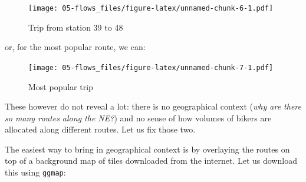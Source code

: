 \documentclass[
]{book}
\newenvironment{Shaded}{\begin{snugshade}}{\end{snugshade}}
\newcommand{\DecValTok}[1]{\textcolor[rgb]{0.00,0.00,0.81}{#1}}
\newcommand{\KeywordTok}[1]{\textcolor[rgb]{0.13,0.29,0.53}{\textbf{#1}}}
\newcommand{\NormalTok}[1]{#1}
\newcommand{\OperatorTok}[1]{\textcolor[rgb]{0.81,0.36,0.00}{\textbf{#1}}}
\newcommand{\StringTok}[1]{\textcolor[rgb]{0.31,0.60,0.02}{#1}}
\begin{document}
\begin{Shaded}
\end{Shaded}

\begin{figure}
\centering
\texttt{[image: 05-flows\_files/figure-latex/unnamed-chunk-6-1.pdf]}
\caption{\label{fig:unnamed-chunk-6}Trip from station 39 to 48}
\end{figure}

or, for the most popular route, we can:

\begin{Shaded}
\end{Shaded}

\begin{figure}
\centering
\texttt{[image: 05-flows\_files/figure-latex/unnamed-chunk-7-1.pdf]}
\caption{\label{fig:unnamed-chunk-7}Most popular trip}
\end{figure}

These however do not reveal a lot: there is no geographical context (\emph{why are there so many routes along the NE?}) and no sense of how volumes of bikers are allocated along different routes. Let us fix those two.

The easiest way to bring in geographical context is by overlaying the routes on top of a background map of tiles downloaded from the internet. Let us download this using \texttt{ggmap}:
\end{document}
